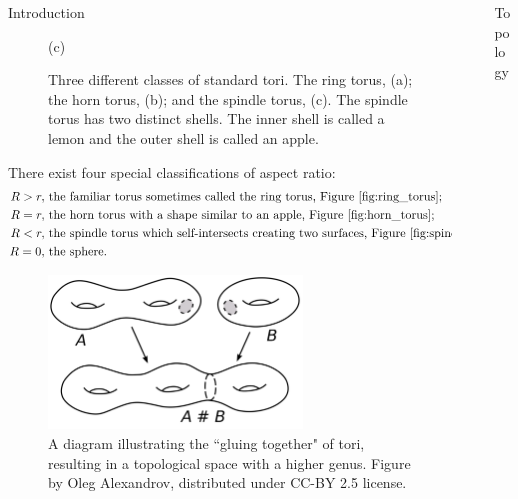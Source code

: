 \documentclass{beamer}
\newlength{\sepwidth}
\newlength{\colwidth}
\newcommand{\separatorcolumn}{\begin{column}{\sepwidth}\end{column}}
\begin{document}
\begin{frame}[t]
\begin{columns}[t]
\begin{column}{\colwidth}
\begin{block}{Introduction}
\begin{figure}[ht]
\begin{minipage}[b]{0.3\textwidth}
        \caption*{(c)}
        \label{fig:spindle_torus}
    \end{minipage}
    \caption{Three different classes of standard tori. The ring torus, (a); the horn torus, (b); and the spindle torus, (c). The spindle torus has two distinct shells. The inner shell is called a lemon and the outer shell is called an apple.}
    \label{fig:three_torus}
\end{figure}

There exist four special classifications of aspect ratio:
\begin{align*}
R>r,&\ \text{the familiar torus sometimes called the ring torus, Figure~\ref{fig:ring_torus};}\\
R=r,&\ \text{the horn torus with a shape similar to an apple, Figure~\ref{fig:horn_torus};}\\
R<r,&\ \text{the spindle torus which self-intersects creating two surfaces, Figure~\ref{fig:spindle_torus};}\\
R=0,&\ \text{the sphere.}
\end{align*}

\begin{figure}
    \centering
    \includegraphics[width=0.7\textwidth]{figures/genus.png}
    \caption{A diagram illustrating the ``gluing together" of tori, resulting in a topological space with a higher genus. Figure by Oleg Alexandrov, distributed under CC-BY 2.5 license.}
    \label{fig:genus}
\end{figure}

\end{block}
\end{column}
\separatorcolumn%

\begin{column}{\colwidth}
\begin{block}{Topology}


\end{block}
\end{column}
\end{columns}
\end{frame}
\end{document}
